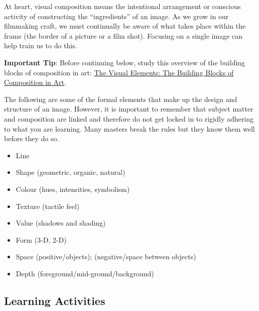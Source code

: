 \documentclass[
]{book}
\providecommand{\tightlist}{%
  \setlength{\itemsep}{0pt}\setlength{\parskip}{0pt}}
\begin{document}
At heart, visual composition means the intentional arrangement or conscious activity of constructing the ``ingredients'' of an image. As we grow in our filmmaking craft, we must continually be aware of what takes place within the frame (the border of a picture or a film shot). Focusing on a single image can help train us to do this.

\begin{caution}
\textbf{Important Tip}: Before continuing below, study this overview of the building blocks of composition in art: \href{http://www.artyfactory.com/art_appreciation/visual-elements/visual-elements.html}{The Visual Elements: The Building Blocks of Composition in Art}.
\end{caution}

The following are some of the formal elements that make up the design and structure of an image. However, it is important to remember that subject matter and composition are linked and therefore do not get locked in to rigidly adhering to what you are learning. Many masters break the rules but they know them well before they do so.

\begin{itemize}
\tightlist
\item
  Line\\
\item
  Shape (geometric, organic, natural)\\
\item
  Colour (hues, intensities, symbolism)\\
\item
  Texture (tactile feel)\\
\item
  Value (shadows and shading)\\
\item
  Form (3-D, 2-D)\\
\item
  Space (positive/objects); (negative/space between objects)\\
\item
  Depth (foreground/mid-ground/background)
\end{itemize}

\hypertarget{learning-activities-9}{%
\subsection*{Learning Activities}\label{learning-activities-9}}
\end{document}
